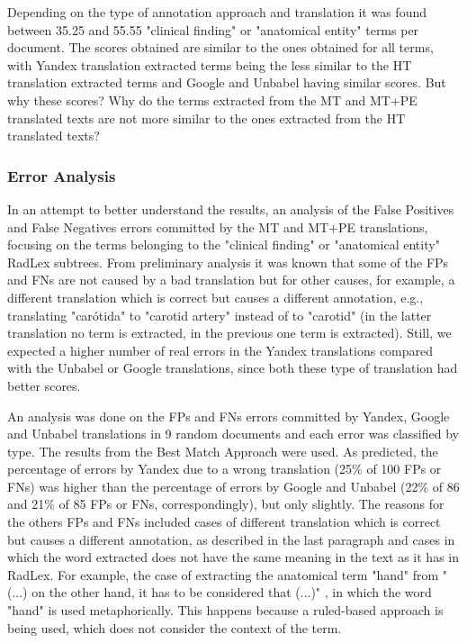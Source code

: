 Depending on the type of annotation approach and translation it was found between 35.25 and 55.55 "clinical finding" or "anatomical entity" terms per document. The scores obtained are similar to the ones obtained for all terms, with Yandex translation extracted terms being the less similar to the HT translation extracted terms and Google and Unbabel having similar scores. But why these scores? Why do the terms extracted from the MT and MT+PE translated texts are not more similar to the ones extracted from the HT translated texts?

\subsubsection{Error Analysis}

In an attempt to better understand the results, an analysis of the False Positives and False Negatives errors committed by the MT and MT+PE translations, focusing on the terms belonging to the "clinical finding" or "anatomical entity" RadLex subtrees. From preliminary analysis it was known that some of the FPs and FNs are not caused by a bad translation but for other causes, for example, a different translation which is correct but causes a different annotation, e.g., translating "carótida" to "carotid artery" instead of to "carotid" (in the latter translation no term is extracted, in the previous one term is extracted). Still, we expected a higher number of real errors in the Yandex translations compared with the Unbabel or Google translations, since both these type of translation had better scores.

An analysis was done on the FPs and FNs errors committed by Yandex, Google and Unbabel translations in 9 random documents and each error was classified by type. The results from the Best Match Approach were used. As predicted, the percentage of errors by Yandex due to a wrong translation (25\% of 100 FPs or FNs) was higher than the percentage of errors by Google and Unbabel (22\% of 86 and 21\% of 85 FPs or FNs, correspondingly), but only slightly. The reasons for the others FPs and FNs included cases of different translation which is correct but causes a different annotation, as described in the last paragraph and cases in which the word extracted does not have the same meaning in the text as it has in RadLex. For example, the case of extracting the anatomical term "hand" from "(...) on the other hand, it has to be considered that (...)" , in which the word "hand" is used metaphorically. This happens because a ruled-based approach is being used, which does not consider the context of the term. 

